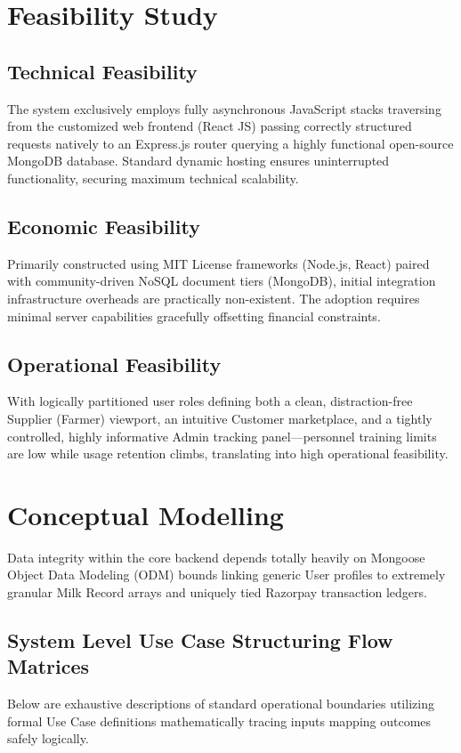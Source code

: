 \documentclass[12pt,a4paper]{report}
\begin{document}
\section{Feasibility Study}
\subsection{Technical Feasibility}
The system exclusively employs fully asynchronous JavaScript stacks traversing from the customized web frontend (React JS) passing correctly structured requests natively to an Express.js router querying a highly functional open-source MongoDB database. Standard dynamic hosting ensures uninterrupted functionality, securing maximum technical scalability.
\subsection{Economic Feasibility}
Primarily constructed using MIT License frameworks (Node.js, React) paired with community-driven NoSQL document tiers (MongoDB), initial integration infrastructure overheads are practically non-existent. The adoption requires minimal server capabilities gracefully offsetting financial constraints.
\subsection{Operational Feasibility}
With logically partitioned user roles defining both a clean, distraction-free Supplier (Farmer) viewport, an intuitive Customer marketplace, and a tightly controlled, highly informative Admin tracking panel—personnel training limits are low while usage retention climbs, translating into high operational feasibility.

\section{Conceptual Modelling}
Data integrity within the core backend depends totally heavily on Mongoose Object Data Modeling (ODM) bounds linking generic User profiles to extremely granular Milk Record arrays and uniquely tied Razorpay transaction ledgers.

\subsection{System Level Use Case Structuring Flow Matrices}
\renewcommand{\arraystretch}{1.5}
Below are exhaustive descriptions of standard operational boundaries utilizing formal Use Case definitions mathematically tracing inputs mapping outcomes safely logically.
\end{document}
